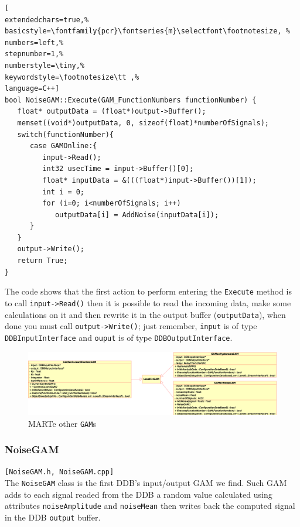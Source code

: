 \begin{lstlisting}[
extendedchars=true,%
basicstyle=\fontfamily{pcr}\fontseries{m}\selectfont\footnotesize, %
numbers=left,%
stepnumber=1,%
numberstyle=\tiny,%
keywordstyle=\footnotesize\tt ,%
language=C++]
bool NoiseGAM::Execute(GAM_FunctionNumbers functionNumber) {
   float* outputData = (float*)output->Buffer();
   memset((void*)outputData, 0, sizeof(float)*numberOfSignals);
   switch(functionNumber){
      case GAMOnline:{
         input->Read();
         int32 usecTime = input->Buffer()[0];
         float* inputData = &(((float*)input->Buffer())[1]);
         int i = 0;
         for (i=0; i<numberOfSignals; i++)
            outputData[i] = AddNoise(inputData[i]);
      }
   }
   output->Write();
   return True;
}
\end{lstlisting}

The code shows that the first action to perform entering the \texttt{Execute} method is to call \texttt{input->Read()} then it is possible to read the incoming data, make some calculations on it and then rewrite it in the output buffer (\texttt{outputData}), when done you must call \texttt{output->Write()}; just remember, \texttt{input} is of type \texttt{DDBInputInterface} and \texttt{ouput} is of type \texttt{DDBOutputInterface}.

\begin{figure}[h!]
 \begin{center}
  \includegraphics[width=\textwidth]{MARTe/GAMs-utils.eps}
  \caption{MARTe other \texttt{GAM}s}
  \label{f:MARTe:GAM:other}
 \end{center}
\end{figure}



\subsubsection{NoiseGAM}
\texttt{[NoiseGAM.h, NoiseGAM.cpp]} \\
The \texttt{NoiseGAM} class is the first DDB's input/output GAM we find. Such GAM adds to each signal readed from the DDB a random value calculated using attributes \texttt{noiseAmplitude} and \texttt{noiseMean} then writes back the computed signal in the DDB \texttt{output} buffer.

